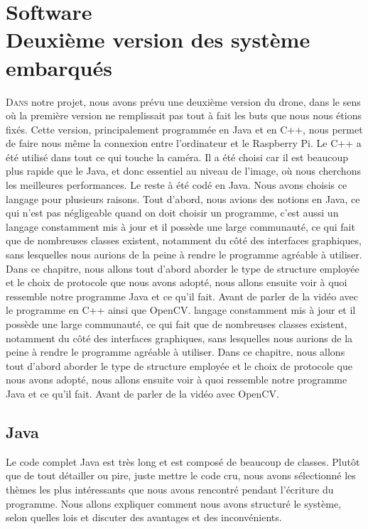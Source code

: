\documentclass[a4paper,11pt]{report}
\begin{document}
{\clearpage

\chapter{Software \\ Deuxième version des système embarqués}

\lettrine{D}{ans} notre projet, nous avons prévu une deuxième version du drone, 
dans le sens où la première version ne remplissait pas tout à fait les buts que nous 
nous étions fixés. Cette version, principalement programmée en Java et en C++, 
nous permet de faire nous même la connexion entre l'ordinateur et le Raspberry Pi. Le C++ a été utilisé dans tout ce qui touche la caméra. Il a été choisi car il est beaucoup plus rapide que le Java, et donc essentiel au niveau de l'image, où nous cherchons les meilleures performances. Le reste à été codé en Java. Nous avons choisis ce langage pour plusieurs raisons. Tout d'abord, nous avions des notions en Java, 
ce qui n'est pas négligeable quand on doit choisir un programme, c'est aussi un langage constamment mis à jour et il possède une large communauté, ce qui fait que de nombreuses classes existent, notamment du côté des interfaces graphiques,
sans lesquelles nous aurions de la peine à rendre le programme agréable à utiliser. Dans ce chapitre, nous allons tout d'abord aborder le type de structure employée et le choix de protocole
que nous avons adopté, nous allons ensuite voir à quoi ressemble notre programme Java et ce qu'il fait. Avant de parler
de la vidéo avec le programme en C++ ainsi que OpenCV.
langage constamment mis à jour et il possède une large communauté, ce qui fait
que de nombreuses classes existent, notamment du côté des interfaces graphiques,
sans lesquelles nous aurions de la peine à rendre le programme agréable à 
utiliser. Dans ce chapitre, nous allons tout d'abord aborder le type de structure employée et le choix de protocole
que nous avons adopté, nous allons ensuite voir à 
quoi ressemble notre programme Java et ce qu'il fait. Avant de parler
de la vidéo avec OpenCV. 

\section{Java}
Le code complet Java est très long et est composé de beaucoup de classes. Plutôt que de tout détailler ou pire, juste mettre le code cru, nous avons sélectionné les thèmes les plus intéressants que nous avons rencontré pendant l'écriture du programme. Nous allons expliquer comment nous avons structuré le système, selon quelles lois et discuter des avantages et des inconvénients.

}
\end{document}
